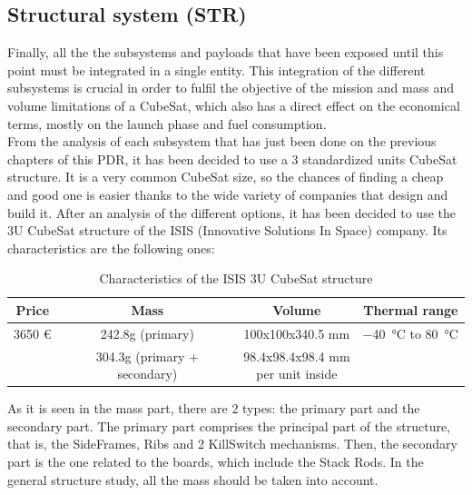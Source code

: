\subsection{Structural system (STR)}

Finally, all the the subsystems and payloads that have been exposed until this
point must be integrated in a single entity.
This integration of the different subsystems is crucial in order to fulfil the
objective of the mission and mass and volume limitations of a CubeSat, which also
has a direct effect on the economical terms, mostly on the launch phase and fuel
consumption.\\

From the analysis of each subsystem that has just been done on the previous chapters
of this PDR, it has been decided to use a 3 standardized units CubeSat structure.
It is a very common CubeSat size, so the chances of finding a cheap and good one
is easier thanks to the wide variety of companies that design and build it.
After an analysis of the different options, it has been decided to use the 3U
CubeSat structure of the ISIS (Innovative Solutions In Space) company.
Its characteristics are the following ones:\\

\begin{table}[h!]
	\centering
	\begin{tabular}{c c c c}
		\hline
		Price & Mass & Volume & Thermal range \\ \hline
		3650 \euro & 242.8g (primary) & 100x100x340.5 mm & \SI{-40}{\degreeCelsius} to \SI{80}{\degreeCelsius} \\
		& 304.3g (primary + secondary) & \pbox{5cm}{98.4x98.4x98.4 mm\\ per unit inside} & \\ \hline
	\end{tabular}
	\caption{Characteristics of the ISIS 3U CubeSat structure}
	\label{tab:str}
\end{table}

As it is seen in the mass part, there are 2 types: the primary part and the secondary
part. The primary part comprises the principal part of the structure, that is, the
SideFrames, Ribs and 2 KillSwitch mechanisms. Then, the secondary part is the one
related to the boards, which include the Stack Rods. In the general structure study,
all the mass should be taken into account.\\

